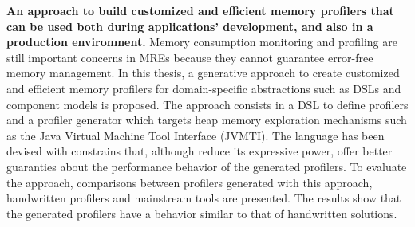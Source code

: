 \documentclass[11pt,a4paper]{paper}
\begin{document}
\textbf{An approach to build customized and efficient memory profilers that can be used both during applications' development, and also in a production environment.}
Memory consumption monitoring and profiling are still important concerns in MREs because they cannot guarantee error-free memory management.
In this thesis, a generative approach to create customized and efficient memory profilers for domain-specific abstractions such as DSLs and component models is proposed.
The approach consists in a DSL to define profilers and a profiler generator which targets heap memory exploration mechanisms such as the Java Virtual Machine Tool Interface (JVMTI).
The language has been devised with constrains that, although reduce its expressive power, offer better guaranties about the performance behavior of the generated profilers.
To evaluate the approach, comparisons between profilers generated with this approach, handwritten profilers and mainstream tools are presented.
The results show that the generated profilers have a behavior similar to that of handwritten solutions.
\end{document}
